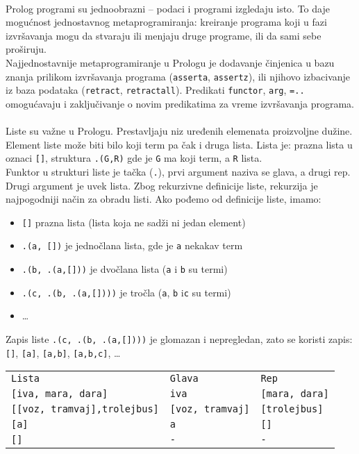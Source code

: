 \documentclass[../main.tex]{subfiles}
\begin{document}
\\
\noindent Prolog programi su jednoobrazni -- podaci i programi izgledaju isto. To daje mogućnost jednostavnog metaprogramiranja: kreiranje programa koji u fazi izvršavanja mogu da stvaraju ili menjaju druge programe, ili da sami sebe proširuju.
\\
Najjednostavnije metaprogramiranje u Prologu je dodavanje činjenica u bazu znanja prilikom izvršavanja programa (\texttt{asserta}, \texttt{assertz}), ili njihovo izbacivanje iz baza podataka (\texttt{retract}, \texttt{retractall}). Predikati \texttt{functor}, \texttt{arg}, \texttt{=..} omogućavaju i zaključivanje o novim predikatima za vreme izvršavanja programa.
\\
\\
\noindent Liste su važne u Prologu. Prestavljaju niz uređenih elemenata proizvoljne dužine. Element liste može biti bilo koji term pa čak i druga lista. Lista je: prazna lista u oznaci \texttt{[]}, struktura \texttt{.(G,R)} gde je \texttt{G} ma koji term, a \texttt{R} lista.
\\
Funktor u strukturi liste je tačka (\texttt{.}), prvi argument naziva se glava, a drugi rep. Drugi argument je uvek lista. Zbog rekurzivne definicije liste, rekurzija je najpogodniji način za obradu listi. Ako pođemo od definicije liste, imamo:
\begin{itemize}
\item \texttt{[]} prazna lista (lista koja ne sadži ni jedan element)
\item \texttt{.(a, [])} je jednočlana lista, gde je \texttt{a} nekakav term
\item \texttt{.(b, .(a,[]))} je dvočlana lista (\texttt{a} i \texttt{b} su termi)
\item \texttt{.(c, .(b, .(a,[])))} je tročla (\texttt{a}, \texttt{b} i\texttt{c} su termi)
\item \ldots
\end{itemize}

Zapis liste \texttt{.(c, .(b, .(a,[])))} je glomazan i nepregledan, zato se koristi zapis: \texttt{[]}, \texttt{[a]}, \texttt{[a,b]}, \texttt{[a,b,c]}, \ldots

\begin{boxprimer}
\begin{tabularx}{\linewidth}{XXX}
\texttt{Lista} & \texttt{Glava} & \texttt{Rep}\\
\texttt{[iva, mara, dara]}&\texttt{iva}&\texttt{[mara, dara]}\\
\texttt{[[voz, tramvaj],trolejbus]}&\texttt{[voz, tramvaj]}&\texttt{[trolejbus]}\\
\texttt{[a]}&\texttt{a}&\texttt{[]}\\
\texttt{[]}&\texttt{-}&\texttt{-} 
\end{tabularx}
\end{boxprimer}
\end{document}
